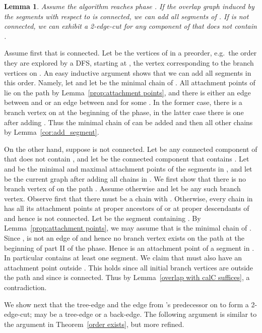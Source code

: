 \documentclass[paper=a4]{scrartcl}
\newtheorem{lemma}{Lemma}
\newcommand{\mqed}{\hfill}
\newlength{\proofpostskipamount}\newlength{\proofpreskipamount}
\newenvironment{proof}{\par\vspace{\proofpreskipamount}\noindent{\textbf{Proof:}}\hspace{0.5em}}{\nopagebreak \strut\nopagebreak \hspace{\fill}\mqed\par\vspace{\proofpostskipamount}\noindent}
\begin{document}
\begin{lemma}\label{lem:add_hard_segments}
  Assume the algorithm reaches phase . If the overlap graph  induced by the segments with respect to   is connected, we can add all segments of . If  is not connected, we can exhibit a 2-edge-cut for any component of  that does not contain .
\end{lemma}
\begin{proof} Assume first that  is connected. Let  be the vertices of  in a preorder, e.g.\ the order they are explored by a DFS, starting at , the vertex corresponding to the branch vertices on . An easy inductive argument shows that we can add all segments in this order. Namely, let  and let  be the minimal chain of . All attachment points of  lie on the path  by Lemma~\ref{prop:attachment points}, and there is either an edge between  and  or an edge between  and  for some .  In the former case, there is a branch vertex on  at the beginning of the phase, in the latter case there is one after adding . Thus the minimal chain of  can be added and then all other chains by Lemma~\ref{cor:add_segment}.

On the other hand, suppose  is not connected. Let  be any connected component of  that does not contain , and let  be the connected component that contains . Let  and  be the minimal and maximal attachment points of the segments in , and let  be the current graph after adding all chains in . We first show that there is no branch vertex of  on the path . Assume otherwise and let  be any such branch vertex. Observe first that there must be a chain  with . Otherwise, every chain in  has all its attachment points at proper ancestors of  or at proper descendants of  and hence  is not connected. Let  be the segment containing . By Lemma~\ref{prop:attachment points}, we may assume that  is the minimal chain of . Since ,  is not an edge of  and hence no branch vertex exists on the path  at the beginning of part II of the phase. Hence  is an attachment point of a segment in . In particular  contains at least one segment. We claim that  must also have an attachment point outside . This holds since all initial branch vertices are outside the path and since  is connected. Thus  by Lemma~\ref{overlap with calC suffices},  a contradiction.

We show next that the tree-edge  and the edge  from 's predecessor  on  to  form a 2-edge-cut;  may be a tree-edge or a back-edge. The following argument is similar to the argument in Theorem~\ref{order exists}, but more refined.


\end{proof}
\end{document}
